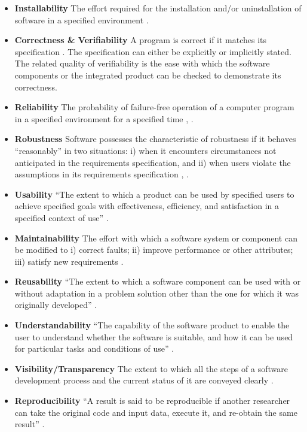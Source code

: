 \documentclass[11pt]{article}
\begin{document}
\begin{itemize}
	\item \textbf{Installability} The effort required for the installation
    and/or uninstallation of software in a specified environment
    \citep{ISO/IEC25010, lenhard2013measuring}.

	\item \textbf{Correctness \& Verifiability} A program is correct if it
    matches its specification \citep[p.\ 17]{GhezziEtAl2003}.  The specification
    can either be explicitly or implicitly stated.  The related quality of
    verifiability is the ease with which the software components or the
    integrated product can be checked to demonstrate its correctness. 

	\item \textbf{Reliability} The probability of failure-free operation of a
	computer program in a specified environment for a specified time
	\citep{musa1987software}, \citep[p.\ 357]{GhezziEtAl2003}.

	\item \textbf{Robustness} Software possesses the characteristic of
	robustness if it behaves ``reasonably'' in two situations: i) when it
	encounters circumstances not anticipated in the requirements specification,
	and ii) when users violate the assumptions in its requirements specification 
	\citep[p.\ 19]{GhezziEtAl2003}, \citep{boehm2007software}.

	\item \textbf{Usability} ``The extent to which a product can be used by
	specified users to achieve specified goals with effectiveness, efficiency,
	and satisfaction in a specified context of use'' \citep{ISO/TR16982:2002,
	ISO9241-11:2018}.

	\item \textbf{Maintainability} The effort with which a software system or
	component can be modified to i) correct faults; ii) improve performance or
	other attributes; iii) satisfy new requirements
	\citep{IEEEStdGlossarySET1990, boehm2007software}.

	\item \textbf{Reusability} ``The extent to which a software component can be
	used with or without adaptation in a problem solution other than the one for
	which it was originally developed'' \citep{kalagiakos2003non}.

	\item \textbf{Understandability} ``The capability of the software product to
	enable the user to understand whether the software is suitable, and how it
	can be used for particular tasks and conditions of use'' \citep{iso2001iec}.

	\item \textbf{Visibility/Transparency} The extent to which all the steps
	of a software development process and the current status of it are conveyed
	clearly \citep[p.\ 32]{GhezziEtAl2003}.

	\item \textbf{Reproducibility} ``A result is said to be reproducible if
	another researcher can take the original code and input data, execute it,
	and re-obtain the same result'' \citep{BenureauAndRougier2017}.
\end{itemize}
\end{document}
